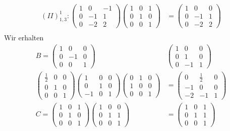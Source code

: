 \documentclass[11pt]{report}
\begin{document}
\begin{align}
(II)^{1}_{1,3}: \begin{pmatrix} 1 & 0 & -1 \\ 0 & -1 & 1 \\ 0 & -2 & 2 \end{pmatrix}\begin{pmatrix} 1 & 0 & 1 \\ 0 & 1 & 0 \\ 0 & 0 & 1 \end{pmatrix} &= \begin{pmatrix} 1 & 0 & 0 \\ 0 & -1 & 1 \\ 0 & -2 & 2 \end{pmatrix} \\
\end{align}
Wir erhalten
\begin{align}
B = \begin{pmatrix} 1 & 0 & 0 \\ 0 & -1 & 0 \\ 0 & 0 & 1\end{pmatrix} &\begin{pmatrix} 1 & 0 & 0 \\ 0 & 1 & 0 \\ 0 & -1 & 1\end{pmatrix}\\
\begin{pmatrix} \frac{1}{2} & 0 & 0 \\ 0 & 1 & 0 \\ 0 & 0 & 1\end{pmatrix}\begin{pmatrix} 1 & 0 & 0 \\ 0 & 1 & 0 \\ -1 & 0 & 1\end{pmatrix}\begin{pmatrix} 0 & 1 & 0 \\ 1 & 0 & 0 \\ 0 & 0 & 1\end{pmatrix} &= \begin{pmatrix} 0 & \frac{1}{2} & 0 \\ -1 & 0 & 0 \\ -2 & -1 & 1\end{pmatrix} \\
C = \begin{pmatrix} 1 & 0 & 1 \\ 0 & 1 & 0 \\ 0 & 0 & 1\end{pmatrix} \begin{pmatrix} 1 & 0 & 0 \\ 0 & 1 & 1 \\ 0 & 0 & 1\end{pmatrix} &= \begin{pmatrix} 1 & 0 & 1 \\ 0 & 1 & 1 \\ 0 & 0 & 1\end{pmatrix} \\

\end{align}
\end{document}
